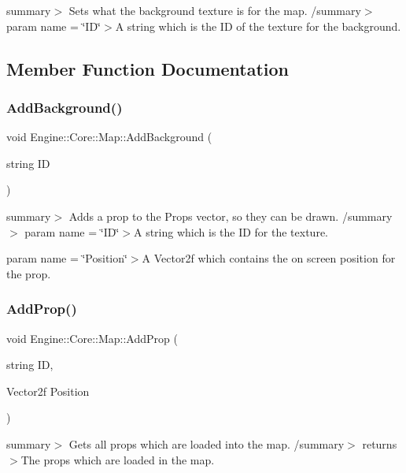 summary$>$ Sets what the background texture is for the map. /summary$>$ param name = \char`\"{}\+I\+D\char`\"{}$>$A string which is the ID of the texture for the background.

\subsection{Member Function Documentation}
\mbox{\label{class_engine_1_1_core_1_1_map_aa81a28822b49c3c7750f0444a189ed8c}} 
\subsubsection{\texorpdfstring{Add\+Background()}{AddBackground()}}
{\footnotesize\ttfamily void Engine\+::\+Core\+::\+Map\+::\+Add\+Background (\begin{DoxyParamCaption}\item[{string}]{ID }\end{DoxyParamCaption})}

summary$>$ Adds a prop to the Props vector, so they can be drawn. /summary$>$ param name = \char`\"{}\+I\+D\char`\"{}$>$A string which is the ID for the texture.

param name = \char`\"{}\+Position\char`\"{}$>$A Vector2f which contains the on screen position for the prop.\mbox{\label{class_engine_1_1_core_1_1_map_aad4517115b5d8713aed2f67338cd7259}} 
\subsubsection{\texorpdfstring{Add\+Prop()}{AddProp()}}
{\footnotesize\ttfamily void Engine\+::\+Core\+::\+Map\+::\+Add\+Prop (\begin{DoxyParamCaption}\item[{string}]{ID,  }\item[{Vector2f}]{Position }\end{DoxyParamCaption})}

summary$>$ Gets all props which are loaded into the map. /summary$>$ returns$>$The props which are loaded in the map.\mbox{\label{class_engine_1_1_core_1_1_map_aeb4eabaf8cbde4e584836daa646c0521}} 
